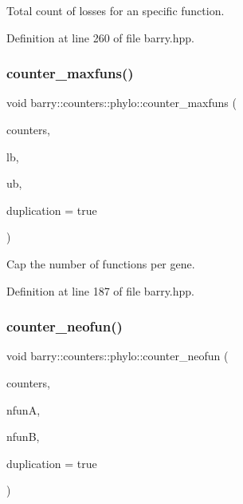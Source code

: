Total count of losses for an specific function. 



Definition at line 260 of file barry.\+hpp.

\mbox{\label{namespacebarry_1_1counters_1_1phylo_a80949b65fbe734d854742306065914bf}} 
\subsubsection{\texorpdfstring{counter\+\_\+maxfuns()}{counter\_maxfuns()}}
{\footnotesize\ttfamily void barry\+::counters\+::phylo\+::counter\+\_\+maxfuns (\begin{DoxyParamCaption}\item[{\hyperlink{namespacebarry_1_1counters_1_1phylo_a4e401ffe66d04091343dcffaf915f8c3}{Phylo\+Counters} $\ast$}]{counters,  }\item[{\hyperlink{namespacebarry_a11dfc53ddb4672278319aa04f1e09a6c}{uint}}]{lb,  }\item[{\hyperlink{namespacebarry_a11dfc53ddb4672278319aa04f1e09a6c}{uint}}]{ub,  }\item[{bool}]{duplication = {\ttfamily true} }\end{DoxyParamCaption})\hspace{0.3cm}{\ttfamily [inline]}}



Cap the number of functions per gene. 



Definition at line 187 of file barry.\+hpp.

\mbox{\label{namespacebarry_1_1counters_1_1phylo_a4cf48d44538ec0646783e29e89027838}} 
\subsubsection{\texorpdfstring{counter\+\_\+neofun()}{counter\_neofun()}}
{\footnotesize\ttfamily void barry\+::counters\+::phylo\+::counter\+\_\+neofun (\begin{DoxyParamCaption}\item[{\hyperlink{namespacebarry_1_1counters_1_1phylo_a4e401ffe66d04091343dcffaf915f8c3}{Phylo\+Counters} $\ast$}]{counters,  }\item[{\hyperlink{namespacebarry_a11dfc53ddb4672278319aa04f1e09a6c}{uint}}]{nfunA,  }\item[{\hyperlink{namespacebarry_a11dfc53ddb4672278319aa04f1e09a6c}{uint}}]{nfunB,  }\item[{bool}]{duplication = {\ttfamily true} }\end{DoxyParamCaption})\hspace{0.3cm}{\ttfamily [inline]}}



